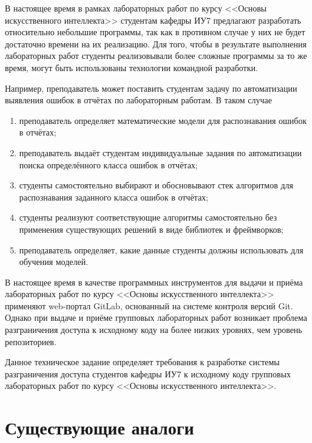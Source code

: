 \documentclass{bmstu}
\begin{document}
  В настоящее время в рамках лабораторных работ по курсу <<Основы
  искусственного интеллекта>> студентам кафедры ИУ7 предлагают
  разработать относительно небольшие программы, так как в противном
  случае у них не будет достаточно времени на их реализацию.
  Для того, чтобы в результате выполнения лабораторных работ студенты
  реализовывали более сложные программы за то же время, могут быть
  использованы технологии командной разработки.
  
  Например, преподаватель может поставить студентам задачу по автоматизации
  выявления ошибок в отчётах по лабораторным работам. В таком случае
  \begin{enumerate}[label*=\arabic*)]
    \item преподаватель определяет математические модели для распознавания
    ошибок в отчётах;
    \item преподаватель выдаёт студентам индивидуальные задания по автоматизации
    поиска определённого класса ошибок в отчётах;
    \item студенты самостоятельно выбирают и обосновывают стек алгоритмов для
    распознавания заданного класса ошибок в отчётах;
    \item студенты реализуют соответствующие алгоритмы самостоятельно без
    применения существующих решений в виде библиотек и фреймворков;
    \item преподаватель определяет, какие данные студенты должны использовать
    для обучения моделей.
  \end{enumerate}

  В настоящее время в качестве программных инструментов для выдачи и
  приёма лабораторных работ по курсу <<Основы искусственного
  интеллекта>> применяют web-портал GitLab, основанный на системе
  контроля версий Git.
  Однако при выдаче и приёме групповых лабораторных работ возникает
  проблема разграничения доступа к исходному коду на более низких
  уровнях, чем уровень репозиториев.

  Данное техническое задание определяет требования к разработке
  системы разграничения доступа студентов кафедры ИУ7 к исходному коду
  групповых лабораторных работ по курсу <<Основы искусственного
  интеллекта>>.

  \section{Существующие аналоги}
\end{document}
